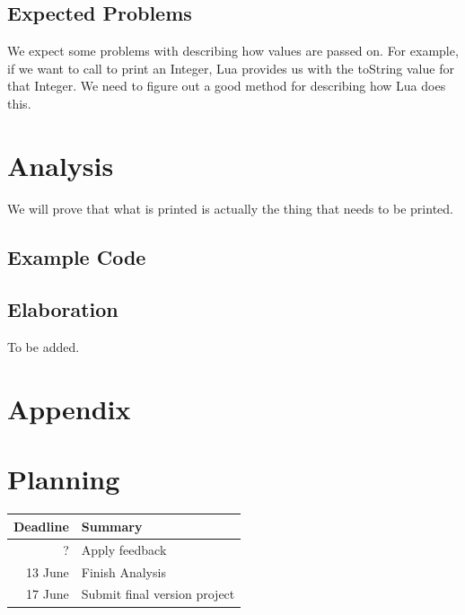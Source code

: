 \documentclass{article}
\begin{document}
\subsection{Expected Problems}
We expect some problems with describing how values are passed on. For example, if we want to call to print an Integer, Lua provides us with the toString value for that Integer. We need to figure out a good method for describing how Lua does this. 

\section{Analysis}
We will prove that what is printed is actually the thing that needs to be printed.
\subsection{Example Code}

\subsection{Elaboration}
To be added. %
\newpage
\section*{Appendix}
\appendix
\section{Planning}
\begin{tabular}{|r|l|}
\hline
 Deadline   &  Summary \\
 \hline
    ? & Apply feedback \\
    13 June & Finish Analysis\\
    17 June & Submit final version project \\
    \hline
\end{tabular}

\end{document}
